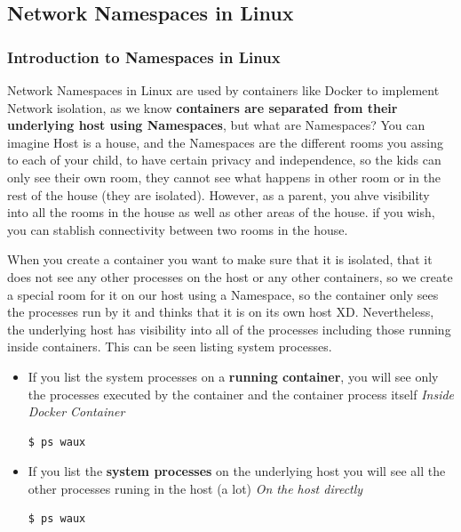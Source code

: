 \documentclass{article}
\newenvironment{codetemplate}[1][]{%
  \mybasecolorbox[#1]
  \itshape
}{%
  \endmybasecolorbox
}
\begin{document}
\subsection{Network Namespaces in Linux}

\subsubsection{Introduction to Namespaces in Linux}

Network Namespaces in Linux are used by containers like Docker to implement Network isolation, as we know \textbf{containers are separated from their underlying host using Namespaces}, but what are Namespaces? You can imagine Host is a house, and the Namespaces are the different rooms you assing to each of your child, to have certain privacy and independence, so the kids can only see their own room, they cannot see what happens in other room or in the rest of the house (they are isolated). However, as a parent, you ahve visibility into all the rooms in the house as well as other areas of the house. if you wish, you can stablish connectivity between two rooms in the house.

When you create a container you want to make sure that it is isolated, that it does not see any other processes on the host or any other containers, so we create a special room for it on our host using a Namespace, so the container only sees the processes run by it and thinks that it is on its own host XD. Nevertheless, the underlying host has visibility into all of the processes including those running inside containers. This can be seen listing system processes.

\begin{itemize}
    \item If you list the system processes on a \textbf{running container}, you will see only the processes executed by the container and the container process itself
\begin{codetemplate}{Inside Docker Container}
\begin{verbatim}
$ ps waux
\end{verbatim}
\end{codetemplate}

    \item If you list the \textbf{system processes} on the underlying host you will see all the other processes runing in the host (a lot)
\begin{codetemplate}{On the host directly}
\begin{verbatim}
$ ps waux
\end{verbatim}
\end{codetemplate}
\end{itemize}
\end{document}
